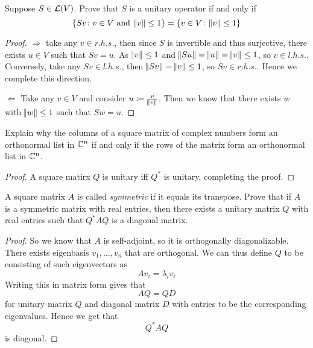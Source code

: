 \documentclass{extarticle}
\begin{document}
\begin{problem}{11}
    Suppose \(S \in \mathcal{L}(V)\). Prove that \(S\) is a unitary operator if and only if 
    \[\{Sv \colon v \in V \text{ and } \norm{v} \leq 1\} = \{v \in V \colon \norm{v} \leq 1\}\]
\end{problem}

\begin{proof}
\(\Rightarrow\) take any \(v \in r.h.s.\), then since \(S\) is invertible and thus surjective, there exists 
\(u \in V\) such that \(Sv = u\). As \(\norm{v} \leq 1\) and \(\norm{Su} = \norm{u} = \norm{v} \leq 1\), 
so \(v \in l.h.s.\). Conversely, take any \(Sv \in l.h.s.\), then \(\norm{Sv} = \norm{v} \leq 1\), so 
\(Sv \in r.h.s.\). Hence we complete this direction. 

\(\Leftarrow\) Take any \(v \in V\) and consider \(u \coloneqq \frac{v}{\norm{v}}\). Then we know that 
there exists \(w\) with \(\norm{w} \leq 1\) such that \(Sw = u \).  

\end{proof}


\begin{problem}{13}
    Explain why the columns of a square matrix of complex numbers form an orthonormal list in \(\mathbb{C}^n\) 
    if and only if the rows of the matrix form an orthonormal list in \(\mathbb{C}^n\). 
\end{problem}

\begin{proof}
A square matirx \(Q\) is unitary iff \(Q^*\) is unitary, completing the proof.
\end{proof}


\begin{problem}{18}
    A square matrix \(A\) is called \emph{symmetric} if it equals its transpose. Prove that if 
    \(A\) is a symmetric matrix with real entries, then there exists a unitary matrix \(Q\) with 
    real entries such that \(Q^* A Q\) is a diagonal matrix. 
\end{problem}

\begin{proof}
So we know that \(A\) is self-adjoint, so it is orthogonally diagonalizable. There exists eigenbasis 
\(v_1, \ldots, v_n\) that are orthogonal. We can thus define \(Q\) to be consisting of such eigenvectors
as 
\[Av_i = \lambda_i v_i\]
Writing this in matrix form gives that 
\[AQ = QD\]
for unitary matrix \(Q\) and diagonal matrix \(D\) with entries to be the corresponding eigenvalues. 
Hence we get that 
\[Q^*AQ\]
is diagonal. 
\end{proof}
\end{document}

